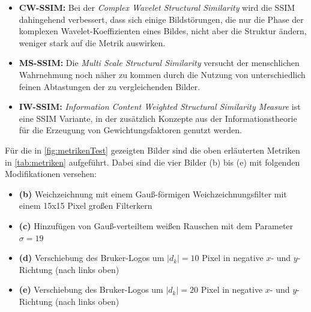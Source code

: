 \begin{itemize}
	\item \textbf{CW-SSIM\cite{Gao2011}:} Bei der \textit{Complex Wavelet Structural Similarity} wird die SSIM dahingehend verbessert, dass sich einige Bildstörungen, die nur die Phase der komplexen Wavelet-Koeffizienten eines Bildes, nicht aber die Struktur ändern, weniger stark auf die Metrik auswirken.
	\item \textbf{MS-SSIM\cite{Wang2003}:} Die \textit{Multi Scale Structural Similarity} versucht der menschlichen Wahrnehmung noch näher zu kommen durch die Nutzung von unterschiedlich feinen Abtastungen der zu vergleichenden Bilder.
	\item \textbf{IW-SSIM\cite{Wang2011}:} \textit{Information Content Weighted Structural Similarity Measure} ist eine SSIM Variante, in der zusätzlich Konzepte aus der Informationstheorie für die Erzeugung von Gewichtungsfaktoren genutzt werden.
\end{itemize}

Für die in \autoref{fig:metrikenTest} gezeigten Bilder sind die oben erläuterten Metriken in \autoref{tab:metriken} aufgeführt. Dabei sind die vier Bilder (b) bis (e) mit folgenden Modifikationen versehen:
\begin{itemize}
	\item \textbf{(b)} Weichzeichnung mit einem Gauß-förmigen Weichzeichnungsfilter mit einem 15x15 Pixel großen Filterkern
	\item \textbf{(c)} Hinzufügen von Gauß-verteiltem weißen Rauschen mit dem Parameter $\sigma=19$
	\item \textbf{(d)} Verschiebung des Bruker-Logos um $|d_k|=10$ Pixel in negative $x$- und $y$-Richtung (nach links oben)
	\item \textbf{(e)} Verschiebung des Bruker-Logos um $|d_k|=20$ Pixel in negative $x$- und $y$-Richtung (nach links oben)
\end{itemize}

